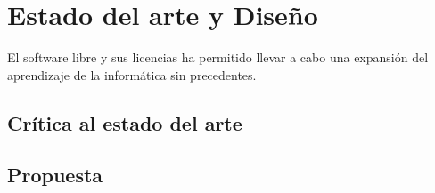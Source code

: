 \chapter{Estado del arte y Diseño}

El software libre y sus licencias \cite{gplv3} ha permitido llevar a cabo una expansión del
aprendizaje de la informática sin precedentes.

\section{Crítica al estado del arte}

\section{Propuesta}